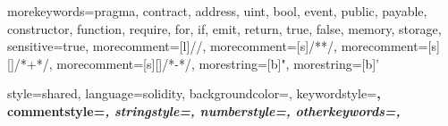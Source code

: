 
 {
  morekeywords={pragma, contract, address, uint, bool, event, public,
    payable, constructor, function, require, for, if, emit, return,
    true, false, memory, storage},
  sensitive=true,
  morecomment=[l]{//},
  morecomment=[s]{/*}{*/},
  morecomment=[s][\color{forestgreen}]{/*+}{*/},
  morecomment=[s][\color{harvardcrimson}]{/*-}{*/},
  morestring=[b]",
  morestring=[b]'
}

 {
  style=shared,
  language=solidity,
	backgroundcolor=\color{eggshell},
	keywordstyle=\bfseries\color{egyptianblue},
	commentstyle=\itshape\color{lava},
	stringstyle=\color{greencssgreen},
	numberstyle=\tiny\color{lavenderindigo},
  otherkeywords={},
}